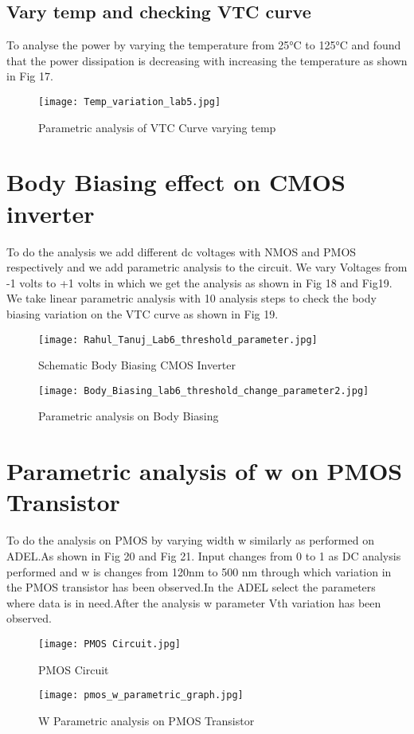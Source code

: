 \documentclass[conference]{IEEEtran}
\begin{document}
\subsection{Vary temp and checking VTC curve}
To analyse the power by varying the temperature from 25°C to 125°C and found that the power dissipation is decreasing with increasing the temperature as shown in Fig 17.
\begin{figure}
    \centering
    \texttt{[image: Temp\_variation\_lab5.jpg]}
    \caption{Parametric analysis of VTC Curve varying temp}
    \label{fig:enter-label}
\end{figure}

\section{Body Biasing effect on CMOS inverter}
To do the analysis we add different dc voltages with NMOS and PMOS respectively and we add parametric analysis to the circuit. We vary Voltages from -1 volts to +1 volts in which we get the analysis as shown in Fig 18 and Fig19.
We take linear parametric analysis with 10 analysis steps to check the body biasing variation on the VTC curve as shown in Fig 19.

\begin{figure}
    \centering
    \texttt{[image: Rahul\_Tanuj\_Lab6\_threshold\_parameter.jpg]}
    \caption{Schematic Body Biasing CMOS Inverter}
    \label{fig:enter-label}
\end{figure}

\begin{figure}
    \centering
    \texttt{[image: Body\_Biasing\_lab6\_threshold\_change\_parameter2.jpg]}
    \caption{Parametric analysis on Body Biasing}
    \label{fig:enter-label}
\end{figure}

\section{Parametric analysis of w on PMOS Transistor}
 To do the analysis on PMOS by varying width w similarly as performed on ADEL.As shown in Fig 20 and Fig 21.
 Input changes from 0 to 1 as DC analysis performed and w is changes from 120nm to 500 nm through which variation in the PMOS transistor has been observed.In the ADEL select the parameters where data is in need.After the analysis w parameter Vth variation has been observed.
 \begin{figure}
     \centering
     \texttt{[image: PMOS Circuit.jpg]}
     \caption{PMOS Circuit}
     \label{fig:enter-label}
 \end{figure}
 \begin{figure}
     \centering
     \texttt{[image: pmos\_w\_parametric\_graph.jpg]}
     \caption{W Parametric analysis on PMOS Transistor}
     \label{fig:enter-label}
 \end{figure}
\end{document}
